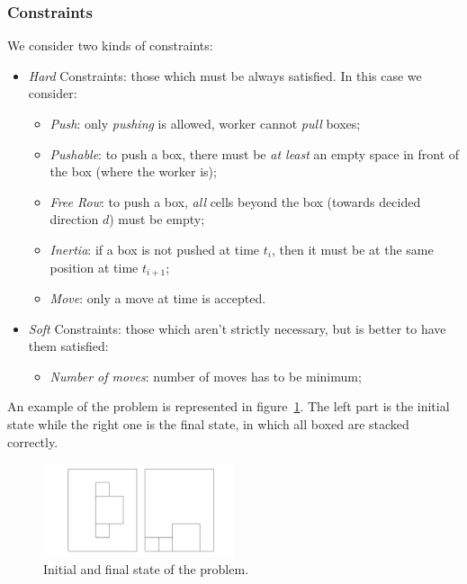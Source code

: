 \documentclass[headinclude, footinclude, abstract=on]{scrarticle}
\begin{document}
\subsubsection{Constraints}
We consider two kinds of constraints:
\begin{itemize}
    \item \textit{Hard} Constraints: those which must be always satisfied.
    In this case we consider:
        \begin{itemize}
            \item \textit{Push}: only \textit{pushing} is allowed, worker cannot \textit{pull} boxes;
            \item \textit{Pushable}: to push a box, there must be \textit{at least} an empty space in front of the box (where the worker is);
            \item \textit{Free Row}: to push a box, \textit{all} cells beyond the box (towards decided direction $d$) must be empty;
            \item \textit{Inertia}: if a box is not pushed at time $t_i$, then it must be at the same position at time ${t}_{i+1}$;
            \item \textit{Move}: only a move at time is accepted.
        \end{itemize}
        
    \item \textit{Soft} Constraints: those which aren't strictly necessary, but is better to have them satisfied:
    \begin{itemize}
        \item \textit{Number of moves}: number of moves has to be minimum;
    \end{itemize}
\end{itemize}

An example of the problem is represented in figure~\ref{fig:set}. The left part is the initial state while the right one is the final state, in which all boxed are stacked correctly. 
\begin{figure}[ht]
	\centering
	\includegraphics[width=0.5\textwidth]{images/set.png}
    \caption{Initial and final state of the problem.}
    \label{fig:set}
\end{figure}
\end{document}

